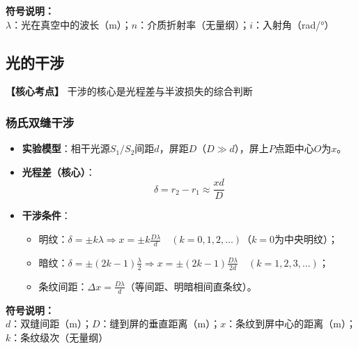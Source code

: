 \textbf{符号说明：} \\
$\lambda$：光在真空中的波长（m）；\quad $n$：介质折射率（无量纲）；\quad $i$：入射角（rad/°）
\vspace{0.5em}

\subsection{光的干涉}
\textbf{【核心考点】} 干涉的核心是光程差与半波损失的综合判断 \par\vspace{0.3em}

\subsubsection{杨氏双缝干涉}
\begin{itemize}
    \item \textbf{实验模型}：相干光源$S_1/S_2$间距$d$，屏距$D$（$D\gg d$），屏上$P$点距中心$O$为$x$。
    \item \textbf{光程差（核心）}：
          \[
          \delta = r_2 - r_1 \approx \frac{xd}{D}
          \]
    \item \textbf{干涉条件}：
          \begin{itemize}
              \item 明纹：$\delta = \pm k\lambda \Rightarrow x = \pm k\frac{D\lambda}{d} \quad (k=0,1,2,\dots)$（$k=0$为中央明纹）；
              \item 暗纹：$\delta = \pm (2k-1)\frac{\lambda}{2} \Rightarrow x = \pm (2k-1)\frac{D\lambda}{2d} \quad (k=1,2,3,\dots)$；
              \item 条纹间距：$\Delta x = \frac{D\lambda}{d}$（等间距、明暗相间直条纹）。
          \end{itemize}
\end{itemize}

\textbf{符号说明：} \\
$d$：双缝间距（m）；\quad $D$：缝到屏的垂直距离（m）；\quad $x$：条纹到屏中心的距离（m）；\quad $k$：条纹级次（无量纲）
\vspace{0.5em}

